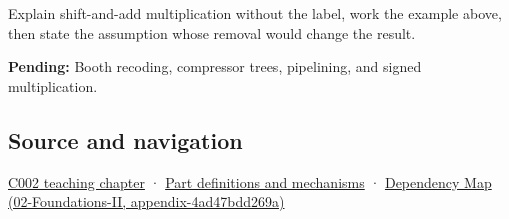 Explain shift-and-add multiplication without the label, work the example above, then state the assumption whose removal would change the result.

\textbf{Pending:} Booth recoding, compressor trees, pipelining, and signed multiplication.

\subsection{Source and navigation}\label{source-and-navigation}

\href{Continuous\%20Notes/Computing\%20Foundations\%20-\%20From\%20Bits\%20to\%20C++\%20and\%20Systems\%20APIs\#Arithmetic\%20becomes\%20a\%20policy}{C002 teaching chapter} · \hyperref[appendix-fd090d982a15]{Part definitions and mechanisms} · \href{}{Dependency Map (02-Foundations-II, appendix-4ad47bdd269a)}
